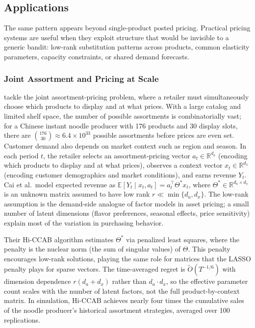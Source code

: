 \subsection{Applications}
\label{sec:dp_applications}

The same pattern appears beyond single-product posted pricing. Practical pricing systems are useful when they exploit structure that would be invisible to a generic bandit: low-rank substitution patterns across products, common elasticity parameters, capacity constraints, or shared demand forecasts.

\subsubsection{Joint Assortment and Pricing at Scale}

\citet{Cai2023} tackle the joint assortment-pricing problem, where a retailer must simultaneously choose which products to display and at what prices. With a large catalog and limited shelf space, the number of possible assortments is combinatorially vast; for a Chinese instant noodle producer with 176 products and 30 display slots, there are $\binom{176}{30} \approx 6.4 \times 10^{33}$ possible assortments before prices are even set. Customer demand also depends on market context such as region and season. In each period $t$, the retailer selects an assortment-pricing vector $a_t \in \mathbb{R}^{d_a}$ (encoding which products to display and at what prices), observes a context vector $x_t \in \mathbb{R}^{d_x}$ (encoding customer demographics and market conditions), and earns revenue $Y_t$. Cai et al.\ model expected revenue as $\mathbb{E}[Y_t \mid x_t, a_t] = a_t^\top \Theta^* x_t$, where $\Theta^* \in \mathbb{R}^{d_a \times d_x}$ is an unknown matrix assumed to have low rank $r \ll \min\{d_a, d_x\}$. The low-rank assumption is the demand-side analogue of factor models in asset pricing; a small number of latent dimensions (flavor preferences, seasonal effects, price sensitivity) explain most of the variation in purchasing behavior.

Their Hi-CCAB algorithm estimates $\Theta^*$ via penalized least squares, where the penalty is the nuclear norm (the sum of singular values) of $\Theta$. This penalty encourages low-rank solutions, playing the same role for matrices that the LASSO penalty plays for sparse vectors. The time-averaged regret is $\tilde{O}(T^{-1/6})$ with dimension dependence $r(d_a + d_x)$ rather than $d_a \cdot d_x$, so the effective parameter count scales with the number of latent factors, not the full product-by-context matrix. In simulation, Hi-CCAB achieves nearly four times the cumulative sales of the noodle producer's historical assortment strategies, averaged over 100 replications.

